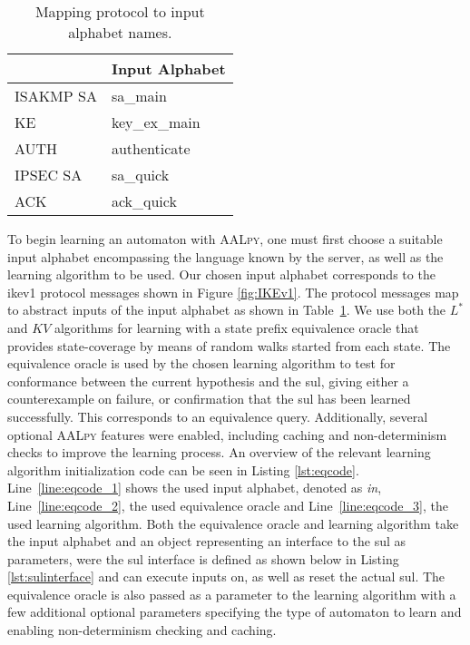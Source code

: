 \begin{table}[h]
	\centering
	\begin{tabular}{|l|l|}
		\hline
		\rowcolor[HTML]{DAE8FC} 
		\hline
		\multicolumn{1}{|l|}{\cellcolor[HTML]{DAE8FC}\textbf{Protocol}} & \multicolumn{1}{l|}{\cellcolor[HTML]{DAE8FC}\textbf{Input Alphabet}} \\ \hline
		ISAKMP SA                                                       & sa\_main                                                             \\
		KE                                                              & key\_ex\_main                                                        \\
		AUTH                                                            & authenticate                                                         \\
		IPSEC SA                                                        & sa\_quick                                                            \\
		ACK                                                             & ack\_quick                                                           \\ \hline
	\end{tabular}
	\caption{Mapping protocol to input alphabet names.}
	\label{tab:map_prot_ia}
\end{table}

To begin learning an automaton with \textsc{AALpy}, one must first choose a suitable input alphabet encompassing the language known by the server, as well as the learning algorithm to be used. Our chosen input alphabet corresponds to the \ac{ike}v1 protocol messages shown in Figure \ref{fig:IKEv1}. The protocol messages map to abstract inputs of the input alphabet as shown in Table~\ref{tab:map_prot_ia}. We use both the $L^*$ and $KV$ algorithms for learning with a state prefix equivalence oracle that provides state-coverage by means of random walks started from each state. The equivalence oracle is used by the chosen learning algorithm to test for conformance between the current hypothesis and the \ac{sul}, giving either a counterexample on failure, or confirmation that the \ac{sul} has been learned successfully. This corresponds to an equivalence query. Additionally, several optional \textsc{AALpy} features were enabled, including caching and non-determinism checks to improve the learning process. An overview of the relevant learning algorithm initialization code can be seen in Listing \ref{lst:eqcode}. Line~\ref{line:eqcode_1} shows the used input alphabet, denoted as \emph{in}, Line~\ref{line:eqcode_2}, the used equivalence oracle and Line~\ref{line:eqcode_3}, the used learning algorithm. Both the equivalence oracle and learning algorithm take the input alphabet and an object representing an interface to the \ac{sul} as parameters, were the \ac{sul} interface is defined as shown below in Listing \ref{lst:sulinterface} and can execute inputs on, as well as reset the actual \ac{sul}. The equivalence oracle is also passed as a parameter to the learning algorithm with a few additional optional parameters specifying the type of automaton to learn and enabling non-determinism checking and caching.

